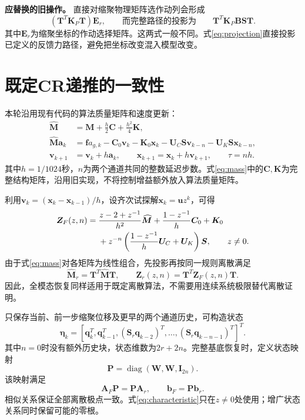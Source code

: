 \documentclass[UTF8,11pt,a4paper]{ctexart}
\newcommand{\mat}[1]{\bm{#1}}
\begin{document}
\textbf{应替换的旧操作。} 直接对缩聚物理矩阵选作动列会形成
\begin{equation}
 (\mat T^T\mat K_P\mat T)\mat E_r,
 \qquad\text{而完整路径的投影为}\qquad
 \mat T^T\mat K_P\mat B\mat S\mat T.\label{eq:shortcut}
\end{equation}
其中$\mat E_r$为缩聚坐标的作动选择矩阵。这两式一般不同。式\eqref{eq:projection}直接投影已定义的反馈力路径，避免把坐标改变混入模型改变。

\section{既定CR递推的一致性}

本轮沿用现有代码的算法质量矩阵和速度更新：
\begin{align}
 \widehat{\mat M}&=\mat M+\frac h2\mat C+\frac{h^2}{4}\mat K,\label{eq:mass}\\
 \widehat{\mat M}\mat a_k&=\mat f a_{g,k}-\mat C_0\mat v_k-\mat K_0\mat x_k
 -\mat U_C\mat S\mat v_{k-n}-\mat U_K\mat S\mat x_{k-n},\\
 \mat v_{k+1}&=\mat v_k+h\mat a_k,\qquad
 \mat x_{k+1}=\mat x_k+h\mat v_{k+1},\qquad \tau=nh.\label{eq:step}
\end{align}
其中$h=1/1024$秒，$n$为两个通道共同的整数延迟步数。式\eqref{eq:mass}中的$\mat C,\mat K$为完整结构矩阵，沿用旧实现，不将控制增益额外放入算法质量矩阵。

利用$\mat v_k=(\mat x_k-\mat x_{k-1})/h$，设齐次试探解$\mat x_k=\mat u z^k$，可得
\begin{align}\label{eq:characteristic}
 \mat Z_F(z,n)={}&\frac{z-2+z^{-1}}{h^2}\widehat{\mat M}
 +\frac{1-z^{-1}}h\mat C_0+\mat K_0\\
 &+z^{-n}\left(\frac{1-z^{-1}}h\mat U_C+\mat U_K\right)\mat S,\qquad z\ne0.\notag
\end{align}
由于式\eqref{eq:mass}对各矩阵为线性组合，先投影再按同一规则离散满足
\begin{equation}\label{eq:discrete_projection}
 \widehat{\mat M}_r=\mat T^T\widehat{\mat M}\mat T,\qquad
 \mat Z_r(z,n)=\mat T^T\mat Z_F(z,n)\mat T.
\end{equation}
因此，全模态恢复同样适用于既定离散算法，不需要用连续系统极限替代离散证明。

只保存当前、前一步缩聚位移及更早的两个通道历史，可构造状态
\begin{equation}
 \mat\eta_k=[\mat q_k^T,\mat q_{k-1}^T,
 (\mat S_r\mat q_{k-2})^T,\ldots,(\mat S_r\mat q_{k-n-1})^T]^T.
\end{equation}
其中$n=0$时没有额外历史块，状态维数为$2r+2n$。完整基底恢复时，定义状态映射
\[\mat P=\operatorname{diag}(\mat W,\mat W,\mat I_{2n}).\]
该映射满足
\begin{equation}\label{eq:similarity}
 \mat A_F\mat P=\mat P\mat A_r,\qquad \mat b_F=\mat P\mat b_r.
\end{equation}
相似关系保证全部离散极点一致。式\eqref{eq:characteristic}只在$z\ne0$处使用；增广状态关系同时保留可能的零根。
\end{document}

